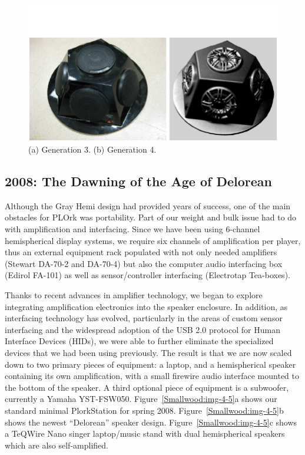\begin{figure}[t]
\centering
\includegraphics[width=\textwidth]{img-3-eps-converted-to-crop.pdf}
\caption{(a) Generation 3. (b) Generation 4.}
\label{Smallwood:img-3} 
\end{figure}



\subsection{2008: The Dawning of the Age of Delorean}
 Although the Gray Hemi design had provided years of success, one of the main obstacles for PLOrk was portability. Part of our weight and bulk issue had to do with amplification and interfacing. Since we have been using 6-channel hemispherical display systems, we require six channels of amplification per player, thus an external equipment rack populated with not only needed amplifiers (Stewart DA-70-2 and DA-70-4) but also the computer audio interfacing box (Edirol FA-101) as well as sensor/controller interfacing (Electrotap Tea-boxes).

Thanks to recent advances in amplifier technology, we began to explore integrating amplification electronics into the speaker enclosure. In addition, as interfacing technology has evolved, particularly in the areas of custom sensor interfacing and the widespread adoption of the USB 2.0 protocol for Human Interface Devices (HIDs), we were able to further eliminate the specialized devices that we had been using previously. The result is that we are now scaled down to two primary pieces of equipment: a laptop, and a hemispherical speaker containing its own amplification, with a small firewire audio interface mounted to the bottom of the speaker.  A third optional piece of equipment is a subwoofer, currently a Yamaha YST-FSW050. Figure~\ref{Smallwood:img-4-5}a shows our standard minimal PlorkStation for spring 2008.  Figure~\ref{Smallwood:img-4-5}b shows the newest ``Delorean'' speaker design.  Figure~\ref{Smallwood:img-4-5}c shows a  TeQWire Nano singer laptop/music stand with dual hemispherical speakers which are also self-amplified.


